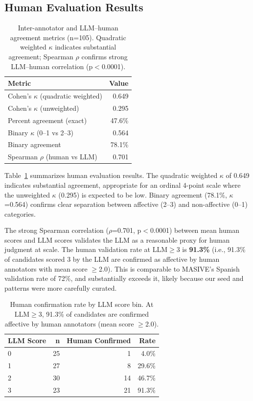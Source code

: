 \documentclass[11pt]{article}
\begin{document}
\subsection{Human Evaluation Results}

\begin{table}[t]
    \centering
    \small
    \begin{tabular}{lr}
        \toprule
        Metric & Value \\
        \midrule
        Cohen's $\kappa$ (quadratic weighted) & 0.649 \\
        Cohen's $\kappa$ (unweighted) & 0.295 \\
        Percent agreement (exact) & 47.6\% \\
        Binary $\kappa$ (0--1 vs 2--3) & 0.564 \\
        Binary agreement & 78.1\% \\
        Spearman $\rho$ (human vs LLM) & 0.701 \\
        \bottomrule
    \end{tabular}
    \caption{Inter-annotator and LLM--human agreement metrics (n=105). Quadratic weighted $\kappa$ indicates substantial agreement; Spearman $\rho$ confirms strong LLM--human correlation (p$<$0.0001).}
    \label{tab:human-eval}
\end{table}

Table~\ref{tab:human-eval} summarizes human evaluation results. The quadratic weighted $\kappa$ of 0.649 indicates substantial agreement, appropriate for an ordinal 4-point scale where the unweighted $\kappa$ (0.295) is expected to be low. Binary agreement (78.1\%, $\kappa$=0.564) confirms clear separation between affective (2--3) and non-affective (0--1) categories.

The strong Spearman correlation ($\rho$=0.701, p$<$0.0001) between mean human scores and LLM scores validates the LLM as a reasonable proxy for human judgment at scale. The human validation rate at LLM$\geq$3 is \textbf{91.3\%} (i.e., 91.3\% of candidates scored 3 by the LLM are confirmed as affective by human annotators with mean score $\geq$2.0). This is comparable to MASIVE's Spanish validation rate of 72\%, and substantially exceeds it, likely because our seed and patterns were more carefully curated.

\begin{table}[t]
    \centering
    \small
    \begin{tabular}{lrrr}
        \toprule
        LLM Score & n & Human Confirmed & Rate \\
        \midrule
        0 & 25 & 1 & 4.0\% \\
        1 & 27 & 8 & 29.6\% \\
        2 & 30 & 14 & 46.7\% \\
        3 & 23 & 21 & 91.3\% \\
        \bottomrule
    \end{tabular}
    \caption{Human confirmation rate by LLM score bin. At LLM$\geq$3, 91.3\% of candidates are confirmed affective by human annotators (mean score $\geq$2.0).}
    \label{tab:threshold}
\end{table}
\end{document}
